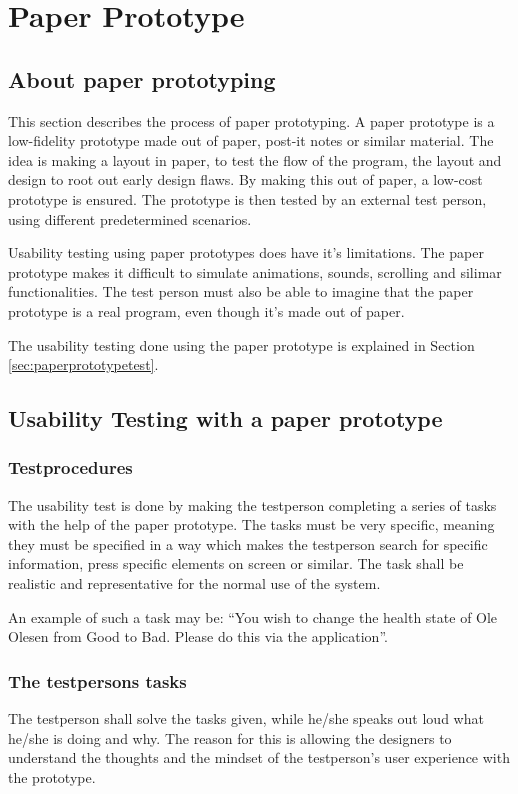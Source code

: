 \chapter{Paper Prototype}
\section{About paper prototyping}
This section describes the process of paper prototyping. 
A paper prototype is a low-fidelity prototype made out of paper, post-it notes or similar material. 
The idea is making a layout in paper, to test the flow of the program, the layout and design to 
root out early design flaws. By making this out of paper, a low-cost prototype is ensured. The 
prototype is then tested by an external test person, using different predetermined scenarios. 

Usability testing using paper prototypes does have it's limitations. The paper prototype makes 
it difficult to simulate animations, sounds, scrolling and silimar functionalities. The test 
person must also be able to imagine that the paper prototype is a real program, even though it's 
made out of paper.  

The usability testing done using the paper prototype is explained in Section \ref{sec:paperprototypetest}.

\section{Usability Testing with a paper prototype}

\subsection{Testprocedures}
The usability test is done by making the testperson completing a series of tasks with the help 
of the paper prototype. The tasks must be very specific, meaning they must be specified in a way 
which makes the testperson search for specific information, press specific elements on screen 
or similar. The task shall be realistic and representative for the normal use of the system.

An example of such a task may be: ``You wish to change the health state of Ole Olesen from Good 
to Bad. Please do this via the application''.

\subsection{The testpersons tasks}
The testperson shall solve the tasks given, while he/she speaks out loud what he/she is doing and 
why. The reason for this is allowing the designers to understand the thoughts and the mindset of 
the testperson's user experience with the prototype.

